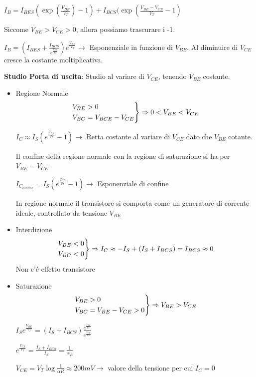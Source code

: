 \documentclass{article}
\begin{document}
\begin{itemize}
        $I_B = I_{BES}(\exp(\frac{V_{BE}}{V_T}) - 1) + I_{BCS} ( \exp(\frac{V_{BE} - V_{CE}}{V_T} - 1)$

        Siccome $V_{BE} > V_{CE} > 0$, allora possiamo trascurare i -1.

        $I_B = \left(I_{BES} + \frac{I_{BCS}}{e^{\frac{V_{CE}}{V_T}}}\right) e^{\frac{V_{BE}}{V_T}} \rightarrow$ Esponenziale in funzione di $V_{BE}$. Al diminuire di $V_{CE}$ cresce la costante moltiplicativa.

\end{itemize}

\textbf{Studio Porta di uscita}: Studio al variare di $V_{CE}$, tenendo $V_{BE}$ costante.

\begin{itemize}
    \item Regione Normale
        \[
            \begin{rcases}
                V_{BE} > 0\\
                V_{BC} = V_{BCE} - V_{CE}
            \end{rcases} \Rightarrow 0 < V_{BE} < V_{CE}
        \]

        $I_C \approx I_S \left( e^{\frac{V_{BE}}{V_T}} -1\right) \rightarrow$ Retta costante al variare di $V_{CE}$ dato che $V_{BE}$ cotante.

        Il confine della regione normale con la regione di saturazione si ha per $V_{BE} = V_{CE}$

        $I_{C_{\text{confine}}} = I_S \left( e^{\frac{V_{CE}}{V_T}} -1\right) \rightarrow$ Esponenziale di confine


        In regione normale il transistore si comporta come un generatore di corrente ideale, controllato da tensione $V_{BE}$

    \item Interdizione
        \[
            \begin{rcases}
                V_{BE} < 0\\
                V_{BC} < 0
            \end{rcases} \Rightarrow I_C \approx -I_S + (I_S + I_{BCS}) = I_{BCS} \approx 0
        \]
        Non c'\'e effetto transistore

    \item Saturazione
        \[
            \begin{rcases}
                V_{BE} > 0\\
                V_{BC} = V_{BE} - V_{CE} > 0
            \end{rcases}\Rightarrow V_{BE} > V_{CE}
        \]

        $I_S e^{\frac{V_{BE}}{V_T}} = (I_S + I_{BCS})\frac{e^{\frac{V_{BE}}{V_T}}}{e^\frac{V_{CE}}{V_T}}$

        $e^{\frac{V_{CE}}{V_T}} = \frac{I_S + I_{BCS}}{I_S} = \frac{1}{\alpha_R}$

        $V_{CE} = V_T \log\frac{1}{\alpha R} \approx 200 mV \rightarrow$ valore della tensione per cui $I_C = 0$

\end{itemize}
\end{document}
